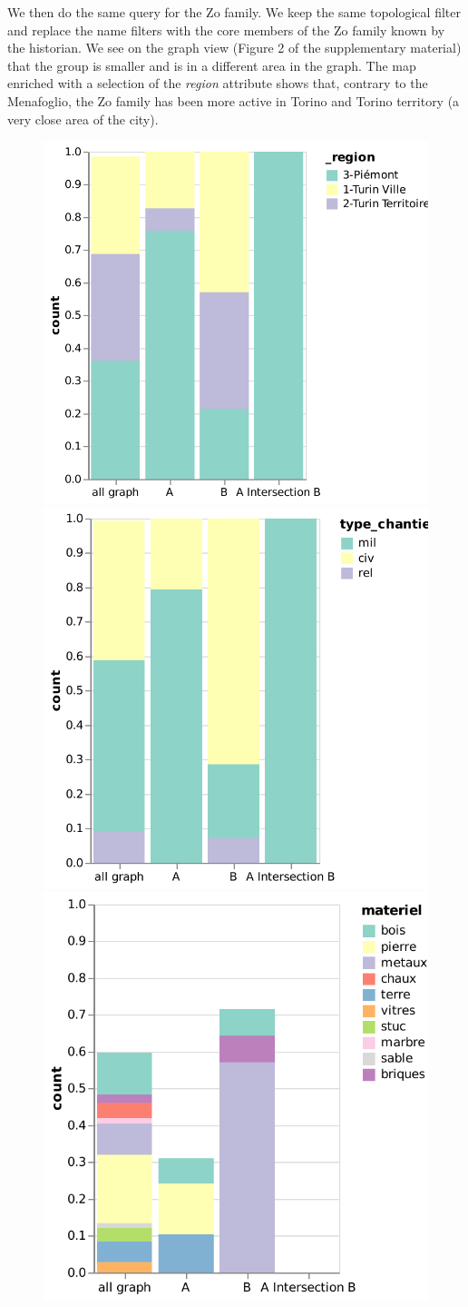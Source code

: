 We then do the same query for the Zo family. We keep the same topological filter and replace the name filters with the core members of the Zo family known by the historian. We see on the graph view (Figure 2 of the supplementary material) that the group is smaller and is in a different area in the graph. The map enriched with a selection of the \textit{region} attribute shows that, contrary to the Menafoglio, the Zo family has been more active in Torino and Torino territory (a very close area of the city).
\begin{figure}[!ht]
    \centering
    \includegraphics[width=0.34\linewidth]{static/figures/ComBiNet/OriginalPaperFigures/CGF/MenaZoPlots/v2/region.pdf}
     \includegraphics[width=0.34\linewidth]{static/figures/ComBiNet/OriginalPaperFigures/CGF/MenaZoPlots/v2/type-chantier.pdf}
     \includegraphics[width=0.34\linewidth]{static/figures/ComBiNet/OriginalPaperFigures/CGF/MenaZoPlots/v2/materiel.pdf}

\end{figure}

